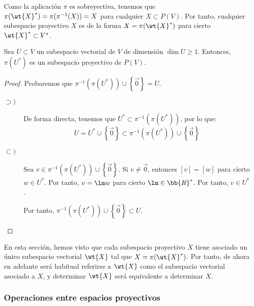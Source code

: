 Como la aplicación $\pi$ es sobreyectiva, tenemos que $\pi(\wt{X}^\ast)=\pi(\pi^{-1}(X))=X$ para cualquier $X\subset P(V)$.
Por tanto, cualquier subespacio proyectivo $X$ es de la forma $X=\pi(\wt{X}^\ast)$ para cierto $\wt{X}^\ast\subset V^\ast$. 
\begin{prop}
    Sea $U\subset V$ un subespacio vectorial de $V$ de dimensión $\dim U \geq 1$. Entonces, $\pi(U^\ast)$ es un subespacio proyectivo de $P(V)$.
\end{prop}
\begin{proof}
    Probaremos que $\pi^{-1}(\pi(U^\ast))\cup \left\{\vec{0}\right\}=U$.
    \begin{description}
        \item[$\supset)$] De forma directa, tenemos que $U^\ast \subset \pi^{-1}(\pi(U^\ast))$, por lo que:
        \begin{equation*}
            U = U^\ast \cup \left\{\vec{0}\right\} \subset \pi^{-1}(\pi(U^\ast))\cup \left\{\vec{0}\right\}
        \end{equation*}

        \item[$\subset)$] Sea $v\in \pi^{-1}(\pi(U^\ast))\cup \left\{\vec{0}\right\}$.
        Si $v\neq \vec{0}$, entonces $[v]=[w]$ para cierto $w\in U^\ast$. Por tanto, $v=\lm w$ para cierto $\lm \in \bb{R}^\ast$. Por tanto, $v\in U^\ast$.

        Por tanto, $\pi^{-1}(\pi(U^\ast))\cup \left\{\vec{0}\right\} \subset U$.
    \end{description}
\end{proof}
\begin{observacion}
    En esta sección, hemos visto que cada subespacio proyectivo $X$ tiene asociado un único
    subespacio vectorial $\wt{X}$ tal que $X=\pi(\wt{X}^\ast)$. Por tanto,
    de ahora en adelante será habitual referirse a $\wt{X}$ como el subespacio vectorial asociado a $X$, y
    determinar $\wt{X}$ será equivalente a determinar $X$.
\end{observacion}

\subsubsection{Operaciones entre espacios proyectivos}

